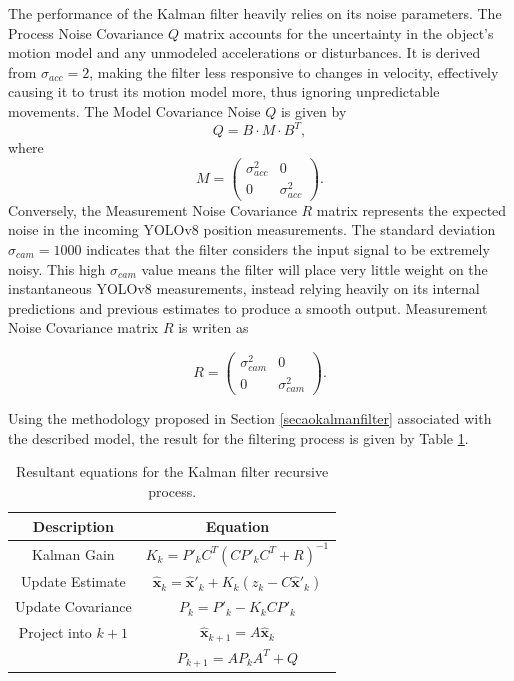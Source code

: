 The performance of the Kalman filter heavily relies on its noise parameters. The Process Noise Covariance $Q$ matrix accounts for the uncertainty in the object's motion model and any unmodeled accelerations or disturbances. It is derived from $\sigma_{acc} = 2$, making the filter less responsive to changes in velocity, effectively causing it to trust its motion model more, thus ignoring unpredictable movements. The Model Covariance Noise $Q$ is given by
\begin{equation*}
Q = B \cdot M \cdot B^T,
\end{equation*}
where
\begin{equation*}
M = \begin{pmatrix} \sigma_{acc}^2 & 0 \\ 0 & \sigma_{acc}^2 \end{pmatrix}.
\end{equation*}
Conversely, the Measurement Noise Covariance $R$ matrix represents the expected noise in the incoming YOLOv8 position measurements. The standard deviation $\sigma_{cam} = 1000$ indicates that the filter considers the input signal to be extremely noisy. This high $\sigma_{cam}$ value means the filter will place very little weight on the instantaneous YOLOv8 measurements, instead relying heavily on its internal predictions and previous estimates to produce a smooth output. Measurement Noise Covariance matrix $R$ is writen as

\begin{equation*}
R = \begin{pmatrix} \sigma_{cam}^2 & 0 \\ 0 & \sigma_{cam}^2 \end{pmatrix}.
\end{equation*}

Using the methodology proposed in Section \ref{secaokalmanfilter} associated with the described model, the result for the filtering process is given by Table \ref{kalmanfilterprocess}.

\begin{table}[H]
\begin{center}
\caption{Resultant equations for the Kalman filter recursive process.}
\label{kalmanfilterprocess}
\begin{tabular}{|c||c|} 
 \hline
 Description & Equation \\ [0.5ex] 
 \hline\hline
 Kalman Gain & $K_k = P'_kC^T(CP'_kC^T + R)^{-1}$\\ 
 \hline
 Update Estimate & $\hat{\bm{x}}_k = \hat{\bm{x}}'_k + K_k(z_k - C\hat{\bm{x}}'_k)$\\
 \hline
 Update Covariance & $P_k = P'_k - K_k C P'_k$\\
 \hline
 Project into $k+1$ & $\hat{\bm{x}}_{k+1} = A \hat{\bm{x}}_k$ \\
					& $P_{k+1} = A P_k A^T + Q$ \\
 \hline
\end{tabular}
\end{center}
\end{table}

